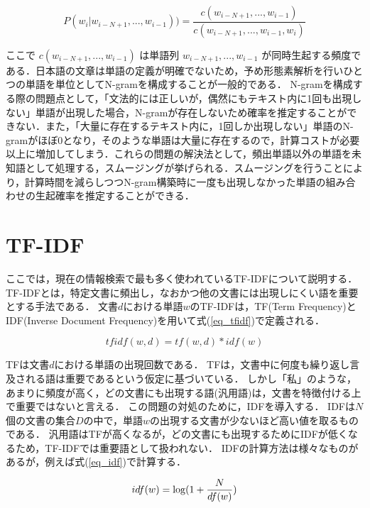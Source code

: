 \begin{equation}
    P(w_i|w_{i-N+1}, ..., w_{i-1})) = \frac{ c(w_{i-N+1}, ..., w_{i-1}) }{ c(w_{i-N+1}, ..., w_{i-1}, w_i) }  
    \label{onkyo_model1}
\end{equation}

ここで $c(w_{i-N+1}, ..., w_{i-1})$ は単語列 $w_{i-N+1}, ..., w_{i-1}$ が同時生起する頻度である．日本語の文章は単語の定義が明確でないため，予め形態素解析を行いひとつの単語を単位としてN-gramを構成することが一般的である． 
N-gramを構成する際の問題点として，「文法的には正しいが，偶然にもテキスト内に1回も出現しない」単語が出現した場合，N-gramが存在しないため確率を推定することができない．また，「大量に存在するテキスト内に，1回しか出現しない」単語のN-gramがほぼ0となり，そのような単語は大量に存在するので，計算コストが必要以上に増加してしまう．これらの問題の解決法として，頻出単語以外の単語を未知語として処理する，スムージングが挙げられる．スムージングを行うことにより，計算時間を減らしつつN-gram構築時に一度も出現しなかった単語の組み合わせの生起確率を推定することができる．


%
%
%

\section{TF-IDF}
ここでは，現在の情報検索で最も多く使われているTF-IDFについて説明する．
TF-IDFとは，特定文書に頻出し，なおかつ他の文書には出現しにくい語を重要とする手法である．
文書$d$における単語$w$のTF-IDFは，TF(Term Frequency)とIDF(Inverse Document Frequency)を用いて式(\ref{eq_tfidf})で定義される．

\begin{equation}
    tfidf(w,d) = tf(w,d) * idf(w)   \label{eq_tfidf}
\end{equation}

TFは文書$d$における単語の出現回数である．
TFは，文書中に何度も繰り返し言及される語は重要であるという仮定に基づいている．
しかし「私」のような，あまりに頻度が高く，どの文書にも出現する語(汎用語)は，文書を特徴付ける上で重要ではないと言える．
この問題の対処のために，IDFを導入する．
IDFは$N$個の文書の集合$D$の中で，単語$w$の出現する文書が少ないほど高い値を取るものである．
汎用語はTFが高くなるが，どの文書にも出現するためにIDFが低くなるため，TF-IDFでは重要語として扱われない．
IDFの計算方法は様々なものがあるが，例えば式(\ref{eq_idf})で計算する．

\begin{equation}
    idf(w) = {\rm log} (1 + \frac{N}{df(w)})  \label{eq_idf}
\end{equation}

